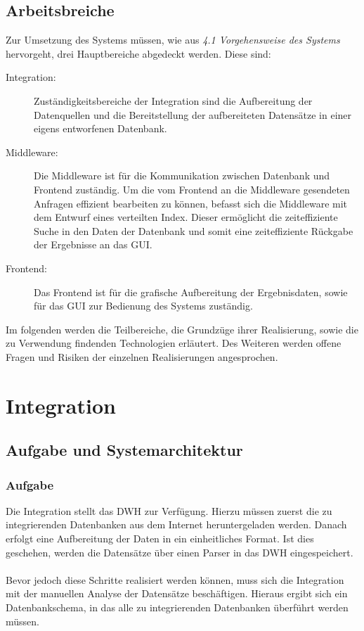 \documentclass{scrartcl}
\begin{document}
\subsection{Arbeitsbreiche}
Zur Umsetzung des Systems müssen, wie aus \textit{4.1 Vorgehensweise des Systems} hervorgeht, drei Hauptbereiche abgedeckt werden. Diese sind:
\begin{description}
\item[Integration:] Zuständigkeitsbereiche der Integration sind die Aufbereitung der Datenquellen und die Bereitstellung der aufbereiteten Datensätze in einer eigens entworfenen Datenbank.

\item[Middleware:] Die Middleware ist für die Kommunikation zwischen Datenbank und Frontend zuständig. Um die vom Frontend an die Middleware gesendeten Anfragen effizient bearbeiten zu können, befasst sich die Middleware mit dem Entwurf eines verteilten Index. Dieser ermöglicht die zeiteffiziente Suche in den Daten der Datenbank und somit eine zeiteffiziente Rückgabe der Ergebnisse an das GUI.

\item[Frontend:] Das Frontend ist für die grafische Aufbereitung der Ergebnisdaten, sowie für das GUI zur Bedienung des Systems zuständig.
\end{description}
Im folgenden werden die Teilbereiche, die Grundzüge ihrer Realisierung, sowie die zu Verwendung findenden Technologien erläutert. Des Weiteren werden offene Fragen und Risiken der einzelnen Realisierungen angesprochen.

\newpage
\section{Integration}
\subsection{Aufgabe und Systemarchitektur}
\subsubsection{Aufgabe}
Die Integration stellt das DWH zur Verfügung. Hierzu müssen zuerst die zu integrierenden Datenbanken aus dem Internet heruntergeladen werden. Danach erfolgt eine Aufbereitung der Daten in ein einheitliches Format.
Ist dies geschehen, werden die Datensätze über einen Parser in das DWH eingespeichert.
\\
\\ Bevor jedoch diese Schritte realisiert werden können, muss sich die Integration mit der manuellen Analyse der Datensätze beschäftigen. Hieraus ergibt sich ein Datenbankschema, in das alle zu integrierenden Datenbanken überführt werden müssen.
\end{document}
